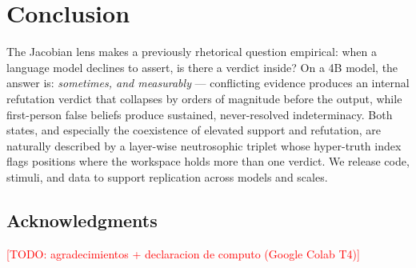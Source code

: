 \documentclass[11pt]{article}
\newcommand{\todo}[1]{\textcolor{red}{[TODO: #1]}}
\begin{document}
\section{Conclusion}

The Jacobian lens makes a previously rhetorical question empirical: when a
language model declines to assert, is there a verdict inside? On a 4B model,
the answer is: \emph{sometimes, and measurably} --- conflicting evidence
produces an internal refutation verdict that collapses by orders of magnitude
before the output, while first-person false beliefs produce sustained,
never-resolved indeterminacy. Both states, and especially the coexistence of
elevated support and refutation, are naturally described by a layer-wise
neutrosophic triplet whose hyper-truth index flags positions where the
workspace holds more than one verdict. We release code, stimuli, and data to
support replication across models and scales.

\subsection*{Acknowledgments}
\todo{agradecimientos + declaracion de computo (Google Colab T4)}
\end{document}
